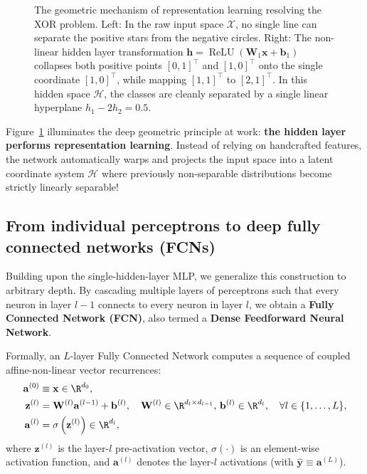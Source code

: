 \begin{figure}[H]
\begin{minipage}{0.48\linewidth}
\end{minipage}
\caption{The geometric mechanism of representation learning resolving the XOR problem. Left: In the raw input space $\mathcal{X}$, no single line can separate the positive stars from the negative circles. Right: The non-linear hidden layer transformation $\mathbf{h} = \operatorname{ReLU}(\mathbf{W}_1 \mathbf{x} + \mathbf{b}_1)$ collapses both positive points $[0, 1]^\top$ and $[1, 0]^\top$ onto the single coordinate $[1, 0]^\top$, while mapping $[1, 1]^\top$ to $[2, 1]^\top$. In this hidden space $\mathcal{H}$, the classes are cleanly separated by a single linear hyperplane $h_1 - 2h_2 = 0.5$.}
\label{fig:xor_representation_warping}
\end{figure}

Figure~\ref{fig:xor_representation_warping} illuminates the deep geometric principle at work: \textbf{the hidden layer performs representation learning}. Instead of relying on handcrafted features, the network automatically warps and projects the input space into a latent coordinate system $\mathcal{H}$ where previously non-separable distributions become strictly linearly separable!

\subsection{From individual perceptrons to deep fully connected networks (FCNs)}
\label{sec:perceptron_to_fcn}

Building upon the single-hidden-layer MLP, we generalize this construction to arbitrary depth. By cascading multiple layers of perceptrons such that every neuron in layer $l-1$ connects to every neuron in layer $l$, we obtain a \textbf{Fully Connected Network (FCN)}, also termed a \textbf{Dense Feedforward Neural Network}.

Formally, an $L$-layer Fully Connected Network computes a sequence of coupled affine-non-linear vector recurrences:
\begin{align}
\mathbf{a}^{(0)} &\equiv \mathbf{x} \in \R^{d_0}, \label{eq:fcn_input} \\
\mathbf{z}^{(l)} &= \mathbf{W}^{(l)} \mathbf{a}^{(l-1)} + \mathbf{b}^{(l)}, \quad \mathbf{W}^{(l)} \in \R^{d_l \times d_{l-1}}, \, \mathbf{b}^{(l)} \in \R^{d_l}, \quad \forall l \in \{1, \dots, L\}, \label{eq:fcn_preactivation} \\
\mathbf{a}^{(l)} &= \sigma\left( \mathbf{z}^{(l)} \right) \in \R^{d_l}, \label{eq:fcn_activation}
\end{align}
where $\mathbf{z}^{(l)}$ is the layer-$l$ pre-activation vector, $\sigma(\cdot)$ is an element-wise activation function, and $\mathbf{a}^{(l)}$ denotes the layer-$l$ activations (with $\hat{\mathbf{y}} \equiv \mathbf{a}^{(L)}$).

